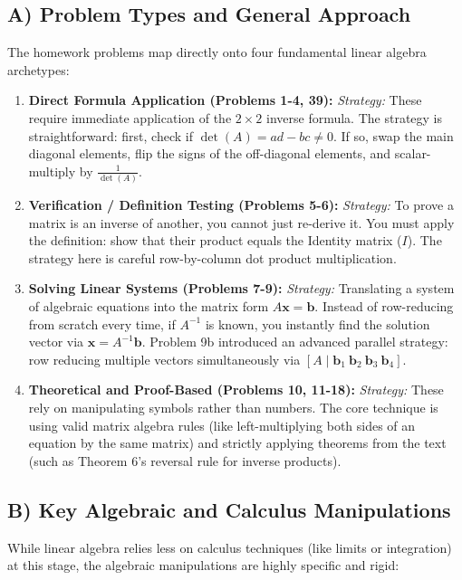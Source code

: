 \documentclass[11pt]{article}
\begin{document}
\subsection{A) Problem Types and General Approach}
The homework problems map directly onto four fundamental linear algebra archetypes:

\begin{enumerate}
    \item \textbf{Direct Formula Application (Problems 1-4, 39):} 
    \textit{Strategy:} These require immediate application of the $2 \times 2$ inverse formula. The strategy is straightforward: first, check if $\det(A) = ad - bc \neq 0$. If so, swap the main diagonal elements, flip the signs of the off-diagonal elements, and scalar-multiply by $\frac{1}{\det(A)}$.
    
    \item \textbf{Verification / Definition Testing (Problems 5-6):} 
    \textit{Strategy:} To prove a matrix is an inverse of another, you cannot just re-derive it. You must apply the definition: show that their product equals the Identity matrix ($I$). The strategy here is careful row-by-column dot product multiplication.
    
    \item \textbf{Solving Linear Systems (Problems 7-9):} 
    \textit{Strategy:} Translating a system of algebraic equations into the matrix form $A\mathbf{x} = \mathbf{b}$. Instead of row-reducing from scratch every time, if $A^{-1}$ is known, you instantly find the solution vector via $\mathbf{x} = A^{-1}\mathbf{b}$. Problem 9b introduced an advanced parallel strategy: row reducing multiple vectors simultaneously via $[ A \mid \mathbf{b}_1 \ \mathbf{b}_2 \ \mathbf{b}_3 \ \mathbf{b}_4 ]$.
    
    \item \textbf{Theoretical and Proof-Based (Problems 10, 11-18):} 
    \textit{Strategy:} These rely on manipulating symbols rather than numbers. The core technique is using valid matrix algebra rules (like left-multiplying both sides of an equation by the same matrix) and strictly applying theorems from the text (such as Theorem 6's reversal rule for inverse products).
\end{enumerate}

\subsection{B) Key Algebraic and Calculus Manipulations}
While linear algebra relies less on calculus techniques (like limits or integration) at this stage, the algebraic manipulations are highly specific and rigid:
\end{document}
